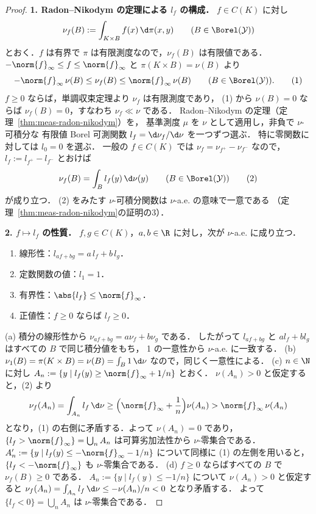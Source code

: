 \begin{proof}
  \textbf{1. Radon--Nikodym の定理による $l_f$ の構成．}
  $f\in C(K)$ に対し
  \[
    \nu_f(B):=\int_{K\times B}f(x)\,\d\pi(x,y)
    \qquad(B\in\Borel(\mathcal{Y}))
  \]
  とおく．$f$ は有界で $\pi$ は有限測度なので，$\nu_f(B)$ は有限値である．
  $-\norm{f}_\infty\leq f\leq\norm{f}_\infty$ と $\pi(K\times B)=\nu(B)$ より
  \[
    -\norm{f}_\infty\,\nu(B)\leq\nu_f(B)\leq\norm{f}_\infty\,\nu(B)
    \qquad(B\in\Borel(\mathcal{Y})).\tag{1}
  \]
  $f\geq0$ ならば，単調収束定理より $\nu_f$ は有限測度であり，
  (1) から $\nu(B)=0$ ならば $\nu_f(B)=0$，すなわち $\nu_f\ll\nu$ である．
  Radon--Nikodym の定理（定理~\ref{thm:meas-radon-nikodym}）を，
  基準測度 $\mu$ を $\nu$ として適用し，非負で $\nu$-可積分な
  有限値 Borel 可測関数 $l_f=\d\nu_f/\d\nu$ を一つずつ選ぶ．
  特に零関数に対しては $l_0=0$ を選ぶ．
  一般の $f\in C(K)$ では $\nu_f=\nu_{f^+}-\nu_{f^-}$ なので，$l_f:=l_{f^+}-l_{f^-}$ とおけば
  \[
    \nu_f(B)=\int_Bl_f(y)\,\d\nu(y)\qquad(B\in\Borel(\mathcal{Y}))\tag{2}
  \]
  が成り立つ．
  (2) をみたす $\nu$-可積分関数は $\nu$-a.e. の意味で一意である
  （定理~\ref{thm:meas-radon-nikodym}の証明の3）．

  \textbf{2. $f\mapsto l_f$ の性質．}
  $f,g\in C(K)$，$a,b\in\R$ に対し，次が $\nu$-a.e. に成り立つ．
  \begin{enumerate}
    \item[(a)] 線形性：$l_{af+bg}=a\,l_f+b\,l_g$．
    \item[(b)] 定数関数の値：$l_1=1$．
    \item[(c)] 有界性：$\abs{l_f}\leq\norm{f}_\infty$．
    \item[(d)] 正値性：$f\geq0$ ならば $l_f\geq0$．
  \end{enumerate}
  (a) 積分の線形性から $\nu_{af+bg}=a\nu_f+b\nu_g$ である．
  したがって $l_{af+bg}$ と $al_f+bl_g$ はすべての $B$ で同じ積分値をもち，
  1 の一意性から $\nu$-a.e. に一致する．
  (b) $\nu_1(B)=\pi(K\times B)=\nu(B)=\int_B1\,\d\nu$ なので，同じく一意性による．
  (c) $n\in\N$ に対し $A_n:=\{y\mid l_f(y)\geq\norm{f}_\infty+1/n\}$ とおく．
  $\nu(A_n)>0$ と仮定すると，(2) より
  \[
    \nu_f(A_n)=\int_{A_n}l_f\,\d\nu\geq\Bigl(\norm{f}_\infty+\frac1n\Bigr)\nu(A_n)>\norm{f}_\infty\,\nu(A_n)
  \]
  となり，(1) の右側に矛盾する．よって $\nu(A_n)=0$ であり，
  $\{l_f>\norm{f}_\infty\}=\bigcup_nA_n$ は可算劣加法性から $\nu$-零集合である．
  $A'_n:=\{y\mid l_f(y)\leq-\norm{f}_\infty-1/n\}$ について同様に (1) の左側を用いると，
  $\{l_f<-\norm{f}_\infty\}$ も $\nu$-零集合である．
  (d) $f\geq0$ ならばすべての $B$ で $\nu_f(B)\geq0$ である．
  $A_n:=\{y\mid l_f(y)\leq-1/n\}$ について $\nu(A_n)>0$ と仮定すると
  $\nu_f(A_n)=\int_{A_n}l_f\,\d\nu\leq-\nu(A_n)/n<0$ となり矛盾する．
  よって $\{l_f<0\}=\bigcup_nA_n$ は $\nu$-零集合である．


\end{proof}
